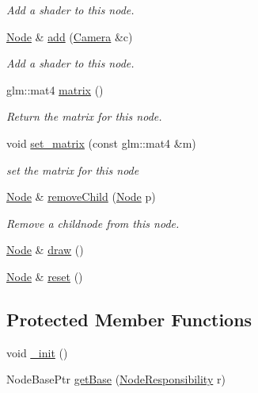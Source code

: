 \begin{DoxyCompactItemize}
\begin{DoxyCompactList}\small\item\em Add a shader to this node. \end{DoxyCompactList}\item 
\hypertarget{classs9_1_1Node_a0fc873bdf9c07aa1f63aafdcd3511ccc}{\hyperlink{classs9_1_1Node}{Node} \& \hyperlink{classs9_1_1Node_a0fc873bdf9c07aa1f63aafdcd3511ccc}{add} (\hyperlink{classs9_1_1Camera}{Camera} \&c)}\label{classs9_1_1Node_a0fc873bdf9c07aa1f63aafdcd3511ccc}

\begin{DoxyCompactList}\small\item\em Add a shader to this node. \end{DoxyCompactList}\item 
\hypertarget{classs9_1_1Node_abeebdb9fd6d487491cf390648b76047a}{glm\-::mat4 \hyperlink{classs9_1_1Node_abeebdb9fd6d487491cf390648b76047a}{matrix} ()}\label{classs9_1_1Node_abeebdb9fd6d487491cf390648b76047a}

\begin{DoxyCompactList}\small\item\em Return the matrix for this node. \end{DoxyCompactList}\item 
\hypertarget{classs9_1_1Node_a005bfd0a28a89193e61f5db16004257f}{void \hyperlink{classs9_1_1Node_a005bfd0a28a89193e61f5db16004257f}{set\-\_\-matrix} (const glm\-::mat4 \&m)}\label{classs9_1_1Node_a005bfd0a28a89193e61f5db16004257f}

\begin{DoxyCompactList}\small\item\em set the matrix for this node \end{DoxyCompactList}\item 
\hyperlink{classs9_1_1Node}{Node} \& \hyperlink{classs9_1_1Node_af7943a5ef0029e3fcfdd63ef5c573ffc}{remove\-Child} (\hyperlink{classs9_1_1Node}{Node} p)
\begin{DoxyCompactList}\small\item\em Remove a childnode from this node. \end{DoxyCompactList}\item 
\hyperlink{classs9_1_1Node}{Node} \& \hyperlink{classs9_1_1Node_a5110feb0ab6c078c4520cf12e91b99db}{draw} ()
\item 
\hyperlink{classs9_1_1Node}{Node} \& \hyperlink{classs9_1_1Node_afb371480f18c5d994ba9bfedcadebaa8}{reset} ()
\end{DoxyCompactItemize}
\subsection*{Protected Member Functions}
\begin{DoxyCompactItemize}
\item 
void \hyperlink{classs9_1_1Node_ab5541e36644656e95fcd214dd47147f9}{\-\_\-init} ()
\item 
Node\-Base\-Ptr \hyperlink{classs9_1_1Node_adc7ba2a843fcc8c24317c09e0fbce6a9}{get\-Base} (\hyperlink{namespaces9_a5c291cd938e865ef990a7f53eec62f36}{Node\-Responsibility} r)
\end{DoxyCompactItemize}
